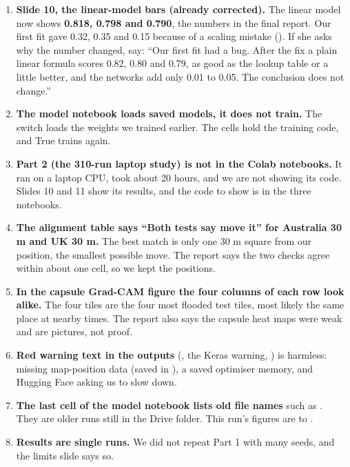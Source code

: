\begin{enumerate}
\item \textbf{Slide 10, the linear-model bars (already corrected).} The linear model now shows \textbf{0.818, 0.798 and 0.790}, the numbers in the final report. Our first fit gave 0.32, 0.35 and 0.15 because of a scaling mistake (). If she asks why the number changed, say: ``Our first fit had a bug. After the fix a plain linear formula scores 0.82, 0.80 and 0.79, as good as the lookup table or a little better, and the networks add only 0.01 to 0.05. The conclusion does not change.''
\item \textbf{The model notebook loads saved models, it does not train.} The switch  loads the weights we trained earlier. The  cells hold the training code, and True trains again.
\item \textbf{Part 2 (the 310-run laptop study) is not in the Colab notebooks.} It ran on a laptop CPU, took about 20 hours, and we are not showing its code. Slides 10 and 11 show its results, and the code to show is in the three notebooks.
\item \textbf{The alignment table says ``Both tests say move it'' for Australia 30 m and UK 30 m.} The best match is only one 30 m square from our position, the smallest possible move. The report says the two checks agree within about one cell, so we kept the positions.
\item \textbf{In the capsule Grad-CAM figure the four columns of each row look alike.} The four tiles are the four most flooded test tiles, most likely the same place at nearby times. The report also says the capsule heat maps were weak and are pictures, not proof.
\item \textbf{Red warning text in the outputs} (, the Keras  warning, ) is harmless: missing map-position data (saved in ), a saved optimiser memory, and Hugging Face asking us to slow down.
\item \textbf{The last cell of the model notebook lists old file names} such as . They are older runs still in the Drive folder. This run's figures are  to .
\item \textbf{Results are single runs.} We did not repeat Part 1 with many seeds, and the limits slide says so.
\end{enumerate}

